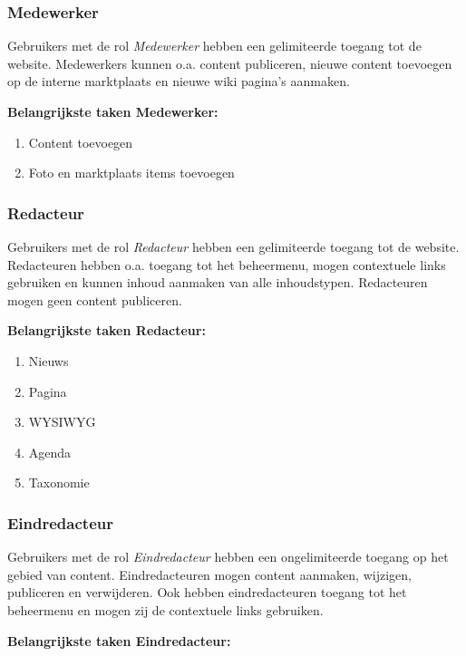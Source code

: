 \subsubsection{Medewerker}\label{medewerker}
Gebruikers met de rol \emph{Medewerker} hebben een gelimiteerde toegang tot de website. Medewerkers kunnen o.a. content publiceren, nieuwe content toevoegen op de interne marktplaats en nieuwe wiki pagina's aanmaken.

\textbf{Belangrijkste taken Medewerker:}

\begin{enumerate}
\item Content toevoegen
\item Foto en marktplaats  items toevoegen
\end{enumerate}

\subsubsection{Redacteur}\label{redacteur}
Gebruikers met de rol \emph{Redacteur} hebben een gelimiteerde toegang tot de website. Redacteuren hebben o.a. toegang tot het beheermenu, mogen contextuele links gebruiken en kunnen inhoud aanmaken van alle inhoudstypen. Redacteuren mogen geen content publiceren.

\textbf{Belangrijkste taken Redacteur:}

\begin{enumerate}
\item Nieuws 
\item Pagina
\item WYSIWYG 
\item Agenda 
\item Taxonomie 
\end{enumerate}

\subsubsection{Eindredacteur}\label{eindredacteur}
Gebruikers met de rol \emph{Eindredacteur} hebben een ongelimiteerde toegang op het gebied van content. Eindredacteuren mogen content aanmaken, wijzigen, publiceren en verwijderen. Ook hebben eindredacteuren toegang tot het beheermenu en mogen zij de contextuele links gebruiken.

\textbf{Belangrijkste taken Eindredacteur:}

